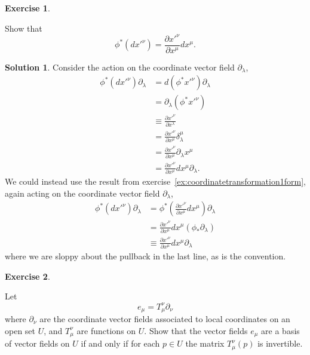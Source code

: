 \documentclass[11pt, a4paper]{article}
\theoremstyle{definition}
\newtheorem{ex}{Exercise}[part]
\newtheorem{sol}{Solution}[part]
\begin{document}
\begin{ex}\label{ex:pullbackdx}

Show that
\[
    \phi^*(dx'^\nu) = \frac{\partial x'^\nu}{\partial x^\mu} dx^\mu.
\]

\end{ex}

\begin{sol}

Consider the action on the coordinate vector field $\partial_\lambda$,
\begin{align*}
    \phi^*(dx'^\nu)\partial_\lambda &= d(\phi^*x'^\nu) \partial_\lambda \\
        &= \partial_\lambda(\phi^*x'^\nu) \\
        &\equiv \frac{\partial x'^\nu}{\partial x^\lambda} \tag{``get used to it''}\\
        &= \frac{\partial x'^\nu}{\partial x^\mu} \delta_\lambda^\mu \\
        &= \frac{\partial x'^\nu}{\partial x^\mu} \partial_\lambda x^\mu \\
        &= \frac{\partial x'^\nu}{\partial x^\mu} dx^\mu \partial_\lambda.
\end{align*}
We could instead use the result from exercise~\ref{ex:coordinatetransformation1form}, again acting on the coordinate vector field $\partial_\lambda$,
\begin{align*}
   \phi^*(dx'^\nu)\partial_\lambda &= \phi^*\left(\frac{\partial x'^\nu}{\partial x^\mu} dx^\mu \right) \partial_\lambda \\
        &= \frac{\partial x'^\nu}{\partial x^\mu} dx^\mu (\phi_* \partial_\lambda) \\
        &\equiv \frac{\partial x'^\nu}{\partial x^\mu} dx^\mu \partial_\lambda
\end{align*}
where we are sloppy about the pullback in the last line, as is the convention.

\end{sol}

\begin{ex}\label{ex:changebasisinvertible}

Let
\[
    e_\mu = T_\mu^\nu\partial_\nu
\]
where $\partial_\nu$ are the coordinate vector fields associated to local coordinates on an open set $U$, and $T_\mu^\nu$ are functions on $U$.
Show that the vector fields $e_\mu$ are a basis of vector fields on $U$ if and only if for each $p \in U$ the matrix $T_\mu^\nu(p)$ is invertible.

\end{ex}
\end{document}
